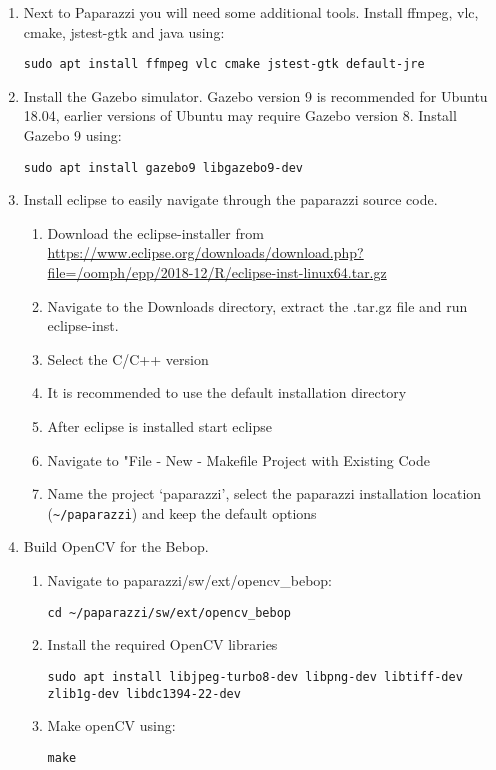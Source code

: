 \begin{enumerate}
	\item Next to Paparazzi you will need some additional tools. Install ffmpeg, vlc, cmake, jstest-gtk and java using:
	\begin{lstlisting}[style=Bash]
		sudo apt install ffmpeg vlc cmake jstest-gtk default-jre
	\end{lstlisting}
	\item Install the Gazebo simulator. Gazebo version 9 is recommended for Ubuntu 18.04, earlier versions of Ubuntu may require Gazebo version 8. Install Gazebo 9 using:
	\begin{lstlisting}[style=Bash]
		sudo apt install gazebo9 libgazebo9-dev
	\end{lstlisting}
	
	\item Install eclipse to easily navigate through the paparazzi source code.
		
	\begin{enumerate}
		\item{Download the eclipse-installer from \url{https://www.eclipse.org/downloads/download.php?file=/oomph/epp/2018-12/R/eclipse-inst-linux64.tar.gz}}
		\item{Navigate to the Downloads directory, extract the .tar.gz file and run eclipse-inst.}
		\item{Select the C/C++ version}
		\item{It is recommended to use the default installation directory}
		\item{After eclipse is installed start eclipse}
		\item{Navigate to "File - New - Makefile Project with Existing Code}
		\item{Name the project `paparazzi', select the paparazzi installation location (\verb|~/paparazzi|) and keep the default options}
	\end{enumerate}
	
	\item Build OpenCV for the Bebop.
	\begin{enumerate}
		\item Navigate to paparazzi/sw/ext/opencv\_bebop:
		\begin{lstlisting}[style=Bash]
			cd ~/paparazzi/sw/ext/opencv_bebop
		\end{lstlisting}
		\item Install the required OpenCV libraries
		\begin{lstlisting}[style=Bash]
			sudo apt install libjpeg-turbo8-dev libpng-dev libtiff-dev zlib1g-dev libdc1394-22-dev
		\end{lstlisting}
		\item Make openCV using:
		\begin{lstlisting}[style=Bash]
			make
		\end{lstlisting}
	\end{enumerate}
\end{enumerate}


